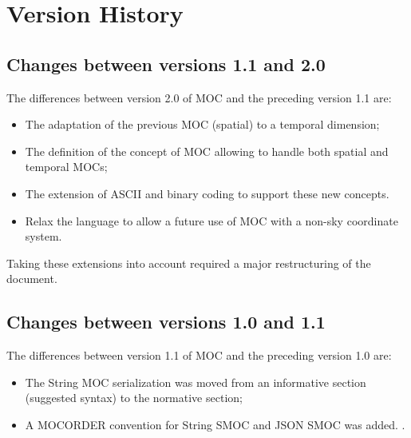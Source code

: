 \documentclass[11pt,a4paper]{ivoa}
\begin{document}
\appendix
\section{Version History}

\subsection{Changes between versions 1.1 and 2.0}

The differences between version 2.0 of MOC and the preceding version 1.1 are:
\begin{itemize}
   \item The adaptation of the previous MOC (spatial) to a temporal
     dimension;
   \item The definition of the concept of MOC allowing to handle both
     spatial and temporal MOCs;
   \item The extension of ASCII and binary coding to support these new
     concepts.
    \item Relax the language to allow a future use of MOC with a non-sky coordinate system. 
\end{itemize}
Taking these extensions into account required a major restructuring of
the document.

\subsection{Changes between versions 1.0 and 1.1}
The differences between version 1.1 of MOC and the preceding version
1.0 are:
\begin{itemize}
   \item The String MOC serialization was moved from an informative
     section (suggested syntax) to the normative section;
   \item A MOCORDER convention for String SMOC and JSON SMOC was added.
     \citep{2020arXiv200707519D}.
\end{itemize}



\newpage

\end{document}
